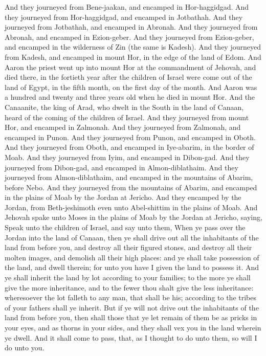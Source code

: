 And they journeyed from Bene-jaakan, and encamped in Hor-haggidgad. And they journeyed from Hor-haggidgad, and encamped in Jotbathah. And they journeyed from Jotbathah, and encamped in Abronah. And they journeyed from Abronah, and encamped in Ezion-geber. And they journeyed from Ezion-geber, and encamped in the wilderness of Zin (the same is Kadesh). And they journeyed from Kadesh, and encamped in mount Hor, in the edge of the land of Edom.  And Aaron the priest went up into mount Hor at the commandment of Jehovah, and died there, in the fortieth year after the children of Israel were come out of the land of Egypt, in the fifth month, on the first day of the month. And Aaron was a hundred and twenty and three years old when he died in mount Hor.  And the Canaanite, the king of Arad, who dwelt in the South in the land of Canaan, heard of the coming of the children of Israel.  And they journeyed from mount Hor, and encamped in Zalmonah. And they journeyed from Zalmonah, and encamped in Punon. And they journeyed from Punon, and encamped in Oboth. And they journeyed from Oboth, and encamped in Iye-abarim, in the border of Moab. And they journeyed from Iyim, and encamped in Dibon-gad. And they journeyed from Dibon-gad, and encamped in Almon-diblathaim. And they journeyed from Almon-diblathaim, and encamped in the mountains of Abarim, before Nebo. And they journeyed from the mountains of Abarim, and encamped in the plains of Moab by the Jordan at Jericho. And they encamped by the Jordan, from Beth-jeshimoth even unto Abel-shittim in the plains of Moab.  And Jehovah spake unto Moses in the plains of Moab by the Jordan at Jericho, saying, Speak unto the children of Israel, and say unto them, When ye pass over the Jordan into the land of Canaan, then ye shall drive out all the inhabitants of the land from before you, and destroy all their figured stones, and destroy all their molten images, and demolish all their high places: and ye shall take possession of the land, and dwell therein; for unto you have I given the land to possess it. And ye shall inherit the land by lot according to your families; to the more ye shall give the more inheritance, and to the fewer thou shalt give the less inheritance: wheresoever the lot falleth to any man, that shall be his; according to the tribes of your fathers shall ye inherit. But if ye will not drive out the inhabitants of the land from before you, then shall those that ye let remain of them be as pricks in your eyes, and as thorns in your sides, and they shall vex you in the land wherein ye dwell. And it shall come to pass, that, as I thought to do unto them, so will I do unto you. 

